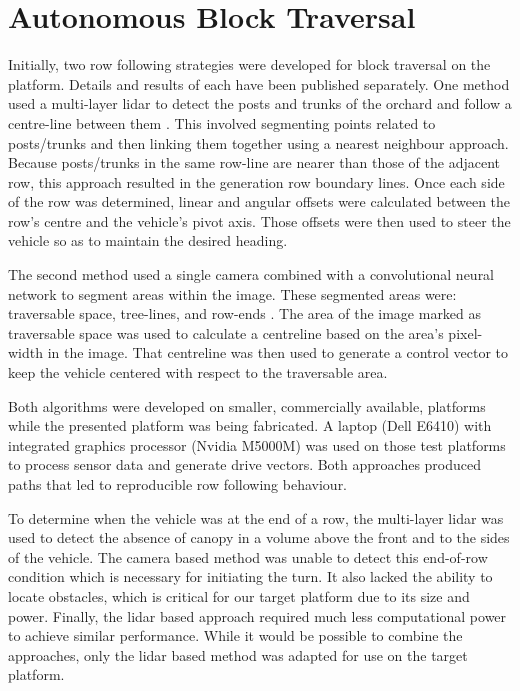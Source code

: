 \documentclass[preprint,authoryear,12pt]{elsarticle}
\begin{document}
\section{Autonomous Block Traversal}
\label{sect:autonomous}
    Initially, two row following strategies were developed for block traversal on the platform.
    Details and results of each have been published separately.
    One method used a multi-layer lidar to detect the posts and trunks of the orchard and follow a centre-line between them \citep{Bell2016}.
    This involved segmenting points related to posts/trunks and then linking them together using a nearest neighbour approach.
    Because posts/trunks in the same row-line are nearer than those of the adjacent row, this approach resulted in the generation row boundary lines.
    Once each side of the row was determined, linear and angular offsets were calculated between the row's centre and the vehicle's pivot axis.
    Those offsets were then used to steer the vehicle so as to maintain the desired heading.

    The second method used a single camera combined with a convolutional neural network to segment areas within the image.
    These segmented areas were: traversable space, tree-lines, and row-ends \citep{Bell2017}.
    The area of the image marked as traversable space was used to calculate a centreline based on the area's pixel-width in the image.
    That centreline was then used to generate a control vector to keep the vehicle centered with respect to the traversable area.

    Both algorithms were developed on smaller, commercially available, platforms while the presented platform was being fabricated.
    A laptop (Dell E6410) with integrated graphics processor (Nvidia M5000M) was used on those test platforms to process sensor data and generate drive vectors.
    Both approaches produced paths that led to reproducible row following behaviour.

    To determine when the vehicle was at the end of a row, the multi-layer lidar was used to detect the absence of canopy in a volume above the front and to the sides of the vehicle.
    The camera based method was unable to detect this end-of-row condition which is necessary for initiating the turn.
    It also lacked the ability to locate obstacles, which is critical for our target platform due to its size and power.
    Finally, the lidar based approach required much less computational power to achieve similar performance.
    While it would be possible to combine the approaches, only the lidar based method was adapted for use on the target platform.
\end{document}
